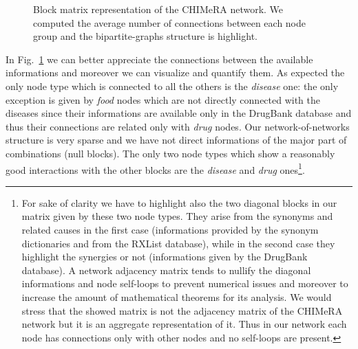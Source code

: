 \documentclass{standalone}
\begin{document}
\begin{figure}[htbp]
\centering
\def\svgwidth{\textwidth}

\caption{Block matrix representation of the \textsf{CHIMeRA} network.
We computed the average number of connections between each node group and the bipartite-graphs structure is highlight.
}
\label{fig:chimera_bipartite}
\end{figure}

In Fig.~\ref{fig:chimera_bipartite} we can better appreciate the connections between the available informations and moreover we can visualize and quantify them.
As expected the only node type which is connected to all the others is the \emph{disease} one: the only exception is given by \emph{food} nodes which are not directly connected with the diseases since their informations are available only in the DrugBank database and thus their connections are related only with \emph{drug} nodes.
Our network-of-networks structure is very sparse and we have not direct informations of the major part of combinations (null blocks).
The only two node types which show a reasonably good interactions with the other blocks are the \emph{disease} and \emph{drug} ones\footnote{
  For sake of clarity we have to highlight also the two diagonal blocks in our matrix given by these two node types.
  They arise from the synonyms and related causes in the first case (informations provided by the synonym dictionaries and from the RXList database), while in the second case they highlight the synergies or not (informations given by the DrugBank database).
  A network adjacency matrix tends to nullify the diagonal informations and node self-loops to prevent numerical issues and moreover to increase the amount of mathematical theorems for its analysis.
  We would stress that the showed matrix is not the adjacency matrix of the \textsf{CHIMeRA} network but it is an aggregate representation of it.
  Thus in our network each node has connections only with other nodes and no self-loops are present.
}.
\end{document}

